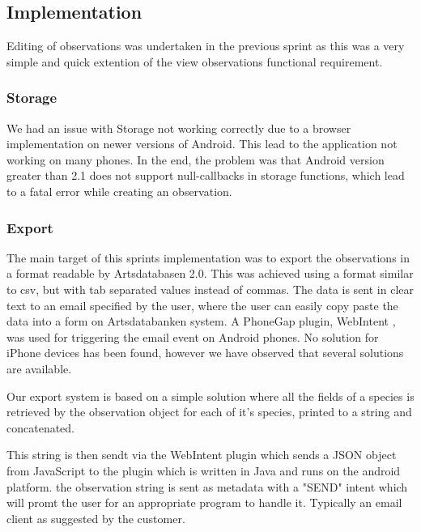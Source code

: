 \subsection{Implementation}

Editing of observations was undertaken in the previous sprint as this was a very simple and quick extention of the view observations functional requirement.

\subsubsection{Storage}

\label{sprint3:storage}

We had an issue with Storage not working correctly due to a browser
implementation on newer versions of Android. This lead to the application
not working on many  phones. In the end, the problem was that Android
version greater than 2.1 does not support null-callbacks in storage functions, which
lead to a fatal error while creating an observation.

	\subsubsection{Export}

	The main target of this sprints implementation was to export the
	observations in a format readable by Artsdatabasen 2.0. This was achieved
	using a format similar to csv, but with tab separated values instead of
	commas. The data is sent in clear text to an email specified by the user,
	where the user can easily copy paste the data into a form on Artsdatabanken
	system. A PhoneGap plugin, WebIntent \cite{library:webintent}, was used for triggering the email
	event on Android phones. No solution for iPhone devices has been found,
	however we have observed that several solutions are available.
	
	Our export system is based on a simple solution where all the fields of a species
	is retrieved by the observation object for each of it's species, printed to a string
	and concatenated.
	
	This string is then sendt via the WebIntent plugin which sends a JSON object from
	JavaScript to the plugin which is written in Java and runs on the android platform.
	the observation string is sent as metadata with a "SEND" intent which will promt 
	the user for an appropriate program to handle it. Typically an email client as
	suggested by the customer.

